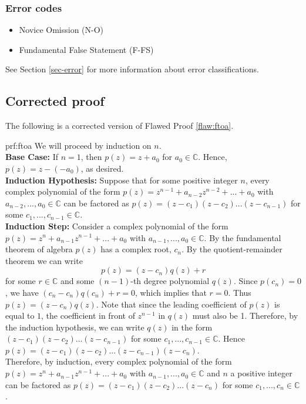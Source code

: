 \subsubsection{Error codes}
\begin{itemize}
    \item Novice Omission (N-O)
	\item Fundamental False Statement (F-FS)
\end{itemize}
See Section \ref{sec-error} for more information about error classifications.

\clearpage
\subsection{Corrected proof}

The following is a corrected version of Flawed Proof \ref{flaw:ftoa}. %

\begin{prf}{prf:ftoa} %
We will proceed by induction on $n$. \\

\noindent \textbf{Base Case:} If $n=1$, then $p(z) = z + a_0$ for $a_0 \in \mathbb{C}$. Hence, $p(z) = z - (-a_0)$, as desired.\\

\noindent \textbf{Induction Hypothesis:} Suppose that for some positive integer $n$, every complex polynomial of the form $p(z) = z^{n-1} + a_{n-2}z^{n-2} + ... + a_0$ with $a_{n-2}, ..., a_0 \in \mathbb{C}$ can be factored as $p(z) = (z-c_1)(z-c_2)...(z-c_{n-1})$ for some $c_1, ..., c_{n-1} \in \mathbb{C}$. \\

\noindent \textbf{Induction Step:} Consider a complex polynomial of the form $p(z) = z^n + a_{n-1}z^{n-1} + ... + a_0$ with $a_{n-1}, ..., a_0 \in \mathbb{C}$. By the fundamental theorem of algebra $p(z)$ has a complex root, $c_n$. By the quotient-remainder theorem we can write
$$p(z) = (z-c_n)q(z) + r $$
for some $r\in\mathbb{C}$ and some $(n-1)$-th degree polynomial $q(z)$. Since $p(c_n) = 0$, we have $(c_n - c_n)q(c_n) + r = 0$, which implies that $r = 0$. Thus $p(z) = (z-c_n)q(z)$. Note that since the leading coefficient of $p(z)$ is equal to $1$, the coefficient in front of  $z^{n-1}$ in $q(z)$ must also be 1. Therefore, by the induction hypothesis, we can write $q(z)$ in the form $(z-c_1)(z-c_2)...(z-c_{n-1})$ for some $c_1, ..., c_{n-1} \in \mathbb{C}$. Hence $p(z) = (z-c_1)(z-c_2)...(z-c_{n-1})(z-c_n)$. \\

Therefore, by induction, every complex polynomial of the form $p(z) = z^n + a_{n-1}z^{n-1} + ... + a_0$ with $a_{n-1}, ..., a_0 \in \mathbb{C}$ and $n$ a positive integer can be factored as $p(z) = (z-c_1)(z-c_2)...(z-c_n)$ for some $c_1, ..., c_n \in \mathbb{C}$.

\end{prf} 